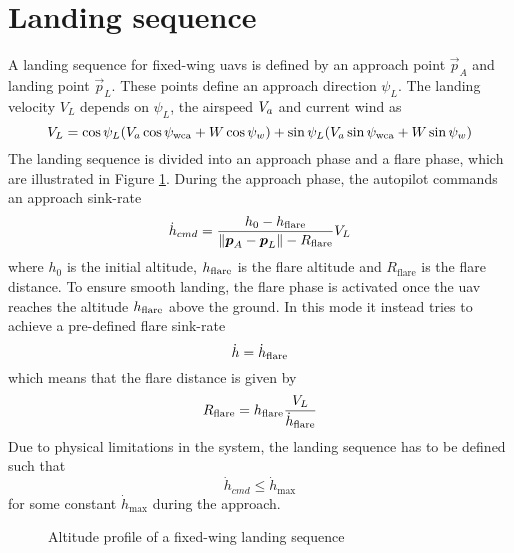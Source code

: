 \section{Landing sequence}
A landing sequence for fixed-wing \acp{uav} is defined by an approach point $\vec{p}_A$ and landing point $\vec{p}_L$. These points 
define an approach direction $\psi_L$. The landing velocity $V_L$ depends on $\psi_L$, the airspeed $V_a$ and current wind as 
\begin{equation}
    V_L=\cos\psi_L(V_a\cos\psi_{\text{wca}}+W\cos\psi_w) + \sin\psi_L(V_a\sin\psi_{\text{wca}}+W\sin\psi_w)
\end{equation}
The landing sequence is divided into an approach phase and a flare phase, which are illustrated in Figure \ref{fig:land_alt}.
During the approach phase, the autopilot commands an approach sink-rate
\begin{equation}\label{eq:sink_rate}
    \dot{h}_{cmd}=\frac{h_0-h_{\text{flare}}}{\|\boldsymbol{p}_A-\boldsymbol{p}_L\|-R_{\text{flare}}}V_L
\end{equation}
where $h_0$ is the initial altitude, $h_{\text{flare}}$ is the flare altitude and $R_{\text{flare}}$ is the flare distance.
To ensure smooth landing, the flare phase is activated once the \ac{uav} reaches the altitude $h_{\text{flare}}$ above the ground. 
In this mode it instead tries to achieve a pre-defined flare sink-rate 
\begin{equation}
    \dot{h}=\dot{h}_{\text{flare}}
\end{equation}
which means that the flare distance is given by
\begin{equation}\label{eq:R_flare}
    R_{\text{flare}}=h_{\text{flare}}\frac{V_L}{\dot{h}_{\text{flare}}}
\end{equation}
Due to physical limitations in the system, the landing sequence has to be defined such that 
\begin{equation}\label{eq:sink_constraint}
    \dot{h}_{cmd}\leq\dot{h}_{\text{max}}
\end{equation}
for some constant $\dot{h}_{\text{max}}$ during the approach.

\begin{figure}
    \begin{center}
    \end{center}
    \caption{Altitude profile of a fixed-wing landing sequence}
    \label{fig:land_alt}
\end{figure}

